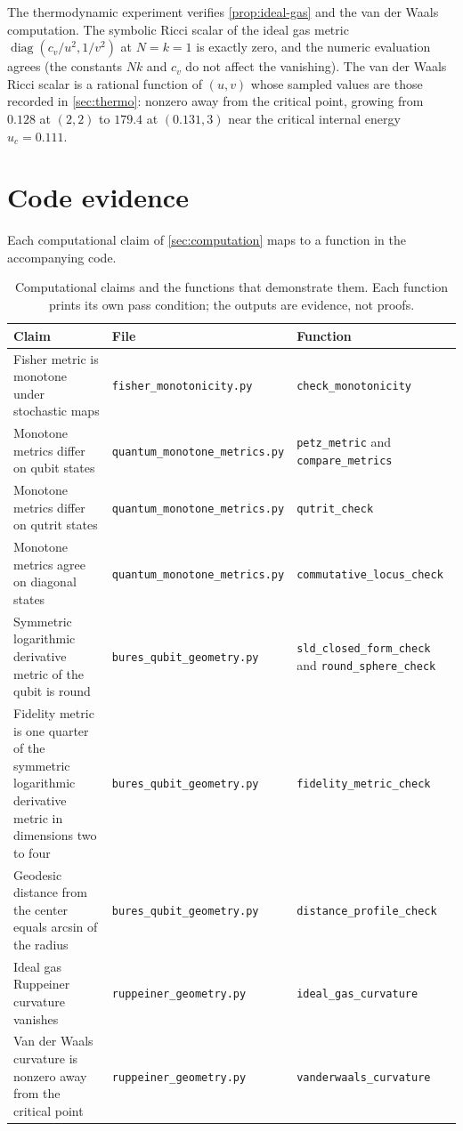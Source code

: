 \documentclass[11pt,letterpaper]{article}
\theoremstyle{definition}
\theoremstyle{remark}
\begin{document}
The thermodynamic experiment verifies \cref{prop:ideal-gas} and the van der Waals computation. The symbolic Ricci scalar of the ideal gas metric $\operatorname{diag}(c_v/u^2, 1/v^2)$ at $N = k = 1$ is exactly zero, and the numeric evaluation agrees (the constants $Nk$ and $c_v$ do not affect the vanishing). The van der Waals Ricci scalar is a rational function of $(u, v)$ whose sampled values are those recorded in \cref{sec:thermo}: nonzero away from the critical point, growing from $0.128$ at $(2, 2)$ to $179.4$ at $(0.131, 3)$ near the critical internal energy $u_c = 0.111$.

\section{Code evidence}
\label{sec:code-appendix}

Each computational claim of \cref{sec:computation} maps to a function in the accompanying code.

\begin{table}[ht]
\centering
\small
\begin{tabular}{L{0.30\textwidth} L{0.32\textwidth} L{0.28\textwidth}}
\toprule
Claim & File & Function \\
\midrule
Fisher metric is monotone under stochastic maps & \texttt{fisher\_monotonicity.py} & \texttt{check\_monotonicity} \\
Monotone metrics differ on qubit states & \texttt{quantum\_monotone\_metrics.py} & \texttt{petz\_metric} and \texttt{compare\_metrics} \\
Monotone metrics differ on qutrit states & \texttt{quantum\_monotone\_metrics.py} & \texttt{qutrit\_check} \\
Monotone metrics agree on diagonal states & \texttt{quantum\_monotone\_metrics.py} & \texttt{commutative\_locus\_check} \\
Symmetric logarithmic derivative metric of the qubit is round & \texttt{bures\_qubit\_geometry.py} & \texttt{sld\_closed\_form\_check} and \texttt{round\_sphere\_check} \\
Fidelity metric is one quarter of the symmetric logarithmic derivative metric in dimensions two to four & \texttt{bures\_qubit\_geometry.py} & \texttt{fidelity\_metric\_check} \\
Geodesic distance from the center equals arcsin of the radius & \texttt{bures\_qubit\_geometry.py} & \texttt{distance\_profile\_check} \\
Ideal gas Ruppeiner curvature vanishes & \texttt{ruppeiner\_geometry.py} & \texttt{ideal\_gas\_curvature} \\
Van der Waals curvature is nonzero away from the critical point & \texttt{ruppeiner\_geometry.py} & \texttt{vanderwaals\_curvature} \\
\bottomrule
\end{tabular}
\caption{Computational claims and the functions that demonstrate them. Each function prints its own pass condition; the outputs are evidence, not proofs.}
\label{tab:code}
\end{table}
\end{document}

